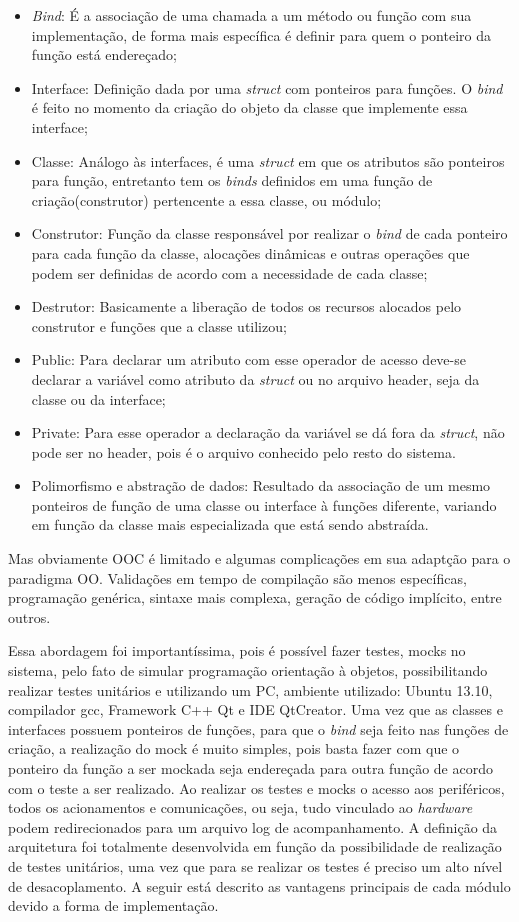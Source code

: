 \begin{itemize}
\item \emph{Bind}: É a associação de uma chamada a um método ou função com sua implementação, de forma mais específica é definir para quem o ponteiro da função está endereçado;
\item Interface: Definição dada por uma \emph{struct} com ponteiros para funções. O \emph{bind} é feito no momento da criação do objeto da classe que implemente essa interface;
\item Classe: Análogo às interfaces, é uma \emph{struct} em que os atributos são ponteiros para função, entretanto tem os \emph{binds} definidos em uma função de criação(construtor) pertencente a essa classe, ou módulo;
\item Construtor: Função da classe responsável por realizar o \emph{bind} de cada ponteiro para cada função da classe, alocações dinâmicas e outras operações que podem ser definidas de acordo com a necessidade de cada classe;
\item Destrutor: Basicamente a liberação de todos os recursos alocados pelo construtor e funções que a classe utilizou;
\item Public: Para declarar um atributo com esse operador de acesso deve-se declarar a variável como atributo da \emph{struct} ou no arquivo header, seja da classe ou da interface;
\item Private: Para esse operador a declaração da variável se dá fora da \emph{struct}, não pode ser no header, pois é o arquivo conhecido pelo resto do sistema.
\item Polimorfismo e abstração de dados: Resultado da associação de um mesmo ponteiros de função de uma classe ou interface à funções diferente, variando em função da classe mais especializada que está sendo abstraída.
\end{itemize}

Mas obviamente OOC é limitado e algumas complicações em sua adaptção para o paradigma OO. Validações em tempo de compilação são menos específicas, programação genérica, sintaxe mais complexa, geração de código implícito, entre outros.

Essa abordagem foi importantíssima, pois é possível fazer testes, mocks no sistema, pelo fato de simular programação orientação à objetos, possibilitando realizar testes unitários e utilizando um PC, ambiente utilizado: Ubuntu 13.10, compilador gcc, Framework C++ Qt e IDE QtCreator. Uma vez que as classes e interfaces possuem ponteiros de funções, para que o \emph{bind} seja feito nas funções de criação, a realização do mock é muito simples, pois basta fazer com que o ponteiro da função a ser mockada seja endereçada para outra função de acordo com o teste a ser realizado. Ao realizar os testes e mocks o acesso aos periféricos, todos os acionamentos e comunicações, ou seja, tudo vinculado ao \emph{hardware} podem redirecionados para um arquivo log de acompanhamento. A definição da arquitetura foi totalmente desenvolvida em função da possibilidade de realização de testes unitários, uma vez que para se realizar os testes é preciso um alto nível de desacoplamento. A seguir está descrito as vantagens principais de cada módulo devido a forma de implementação.

